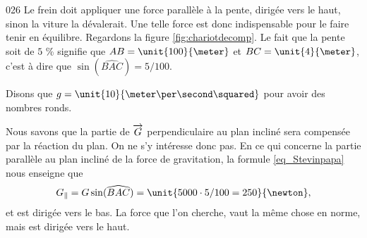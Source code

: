 

\begin{corrige}{026}
Le frein doit appliquer une force parallèle à la pente, dirigée vers le haut, sinon la viture la dévalerait.  Une telle force est donc indispensable pour le faire tenir en équilibre. Regardons la figure \ref{fig:chariotdecomp}. Le fait que la pente soit de $5$ \%  signifie que $AB=\unit{100}{\meter}$ et $BC=\unit{4}{\meter}$, c'est à dire que $\sin(\widehat{BAC})=5/100$. 

Disons que $g=\unit{10}{\meter\per\second\squared}$ pour avoir des nombres ronds.

Nous savons que la partie de $\overrightarrow{G}$ perpendiculaire au plan incliné sera compensée par la réaction du plan. On ne s'y intéresse donc pas. En ce qui concerne la partie parallèle au plan incliné de la force de gravitation, la formule \eqref{eq_Stevinpapa} nous enseigne que
\[ 
  G_{\parallel}=G\sin(\widehat{BAC})=\unit{5000\cdot 5/100=250}{\newton},
\]
et est dirigée vers le bas. La force que l'on cherche, vaut la même chose en norme, mais est dirigée vers le haut.
 
 
\end{corrige}
